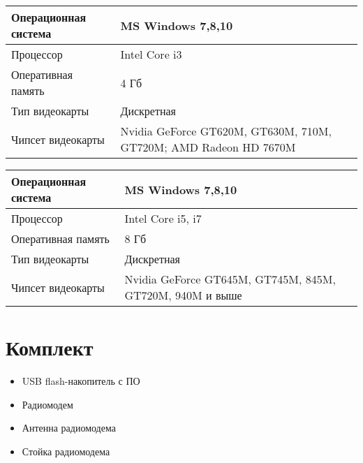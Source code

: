 \documentclass[a4paper,10pt,russian,openany]{sphinxmanual}
\begin{document}


\begin{savenotes}\sphinxattablestart
\centering
\begin{tabulary}{\linewidth}[t]{|T|T|}
\hline

Операционная система
&
MS Windows 7,8,10
\\
\hline
Процессор
&
Intel Core i3
\\
\hline
Оперативная память
&
4 Гб
\\
\hline
Тип видеокарты
&
Дискретная
\\
\hline
Чипсет видеокарты
&
Nvidia GeForce GT620M, GT630M, 710M, GT720M; AMD Radeon HD 7670M
\\
\hline
\end{tabulary}
\par
\sphinxattableend\end{savenotes}



\begin{savenotes}\sphinxattablestart
\centering
\begin{tabulary}{\linewidth}[t]{|T|T|}
\hline

Операционная система
&
MS Windows 7,8,10
\\
\hline
Процессор
&
Intel Core i5, i7
\\
\hline
Оперативная память
&
8 Гб
\\
\hline
Тип видеокарты
&
Дискретная
\\
\hline
Чипсет видеокарты
&
Nvidia GeForce GT645M, GT745M, 845M, GT720M, 940M и выше
\\
\hline
\end{tabulary}
\par
\sphinxattableend\end{savenotes}


\section{Комплект}
\label{\detokenize{nsu:id2}}\begin{itemize}
\item {} 
USB flash-накопитель с ПО

\item {} 
Радиомодем

\item {} 
Антенна радиомодема

\item {} 
Стойка радиомодема

\end{itemize}
\end{document}
